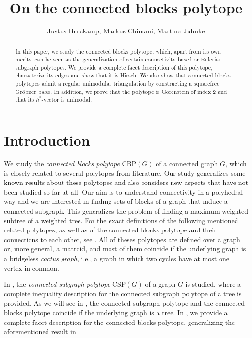 \documentclass[12pt]{amsart}
\title{On the connected blocks polytope}
\author{Justus Bruckamp, Markus Chimani, Martina Juhnke}
\newcommand{\CBP}{\mathrm{CBP}}
\newcommand{\CSP}{\mathrm{CSP}}
\newcommand{\Xr}[1]{}
\newcommand{\Xn}[1]{{\protect#1}}
\begin{document}
\maketitle
\begin{abstract}
In this paper, we study the connected blocks polytope, which, apart from its own merits, can be seen as the generalization of certain connectivity based or Eulerian subgraph polytopes. We provide a complete facet description of this polytope, characterize its edges and show that it is Hirsch. We also show that connected blocks polytopes admit a regular unimodular triangulation by constructing a squarefree Gr\"obner basis. In addition, we prove that the polytope is Gorenstein of index $2$ and that its $h^\ast$-vector is unimodal.
\end{abstract}

\section{Introduction}
We study the \emph{connected blocks polytope} $\CBP(G)$ of a connected graph $G$, which is closely related to several polytopes from literature. Our study generalizes some known results about these polytopes and also considers new aspects that have not been studied so far at all. Our aim is to understand connectivity in a polyhedral way and we are interested in finding sets of blocks of a graph that induce a connected subgraph. This generalizes the problem of finding a maximum weighted subtree of a weighted tree. \Xn{For the exact definitions of the following mentioned related polytopes, as well as of the connected blocks polytope and their connections to each other, see \Cref{sectionConsideredPolytopes}. All of theses polytopes are defined over a graph or, more general, a matroid, and most of them coincide if the underlying graph is a bridgeless \emph{cactus graph}, i.e., a graph in which two cycles have at most one vertex in common.}

In \cite{DKN15}, the \textit{connected subgraph polytope} $\CSP(G)$ of a graph $G$ is studied, where a complete inequality description for the connected subgraph polytope of a tree is provided. \Xn{As we will see in , the connected subgraph polytope and the connected blocks polytope coincide if the underlying graph is a tree. In \Cref{completefacets}, we provide a complete facet description for the connected blocks polytope, generalizing the aforementioned result in \cite{DKN15}.}\Xr{Furthermore, the connected blocks polytope of a Eulerian cactus graph is unimodular equivalent to its corresponding \textit{Eulerian subgraph polytope} and to its \textit{2-edge-connected subgraph polytope}.} 
\end{document}
